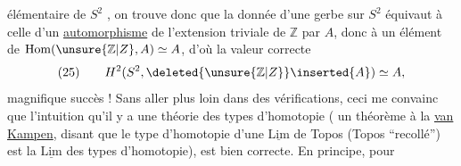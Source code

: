 élémentaire de $S^2$ , on trouve donc
que la donnée d'une gerbe sur $S^2$ équivaut
à celle d'un \uline{automorphisme} de
l'extension triviale  de $\mathbb Z$ par $A$,
donc à un élément de $\operatorname{Hom}(\unsure{\mathbb Z|Z},A)\simeq A$,
d'où la valeur correcte
\[
(25)\qquad H^2(S^2,\deleted{\unsure{\mathbb Z|Z}}\inserted{A})\simeq A,
\]
magnifique succès ! Sans aller plus
loin dans des vérifications, ceci me
convainc que l'intuition qu'il y
a une théorie des 
 types d'homotopie ( un
théorème à la \uline{van Kampen}, disant
que le type d'homotopie d'une
$\underline{\mathrm{Lim}}$ de Topos (Topos ``recollé'') est
la $\underline{\mathrm{Lim}}$ des types d'homotopie),
est bien correcte. En principe, pour

